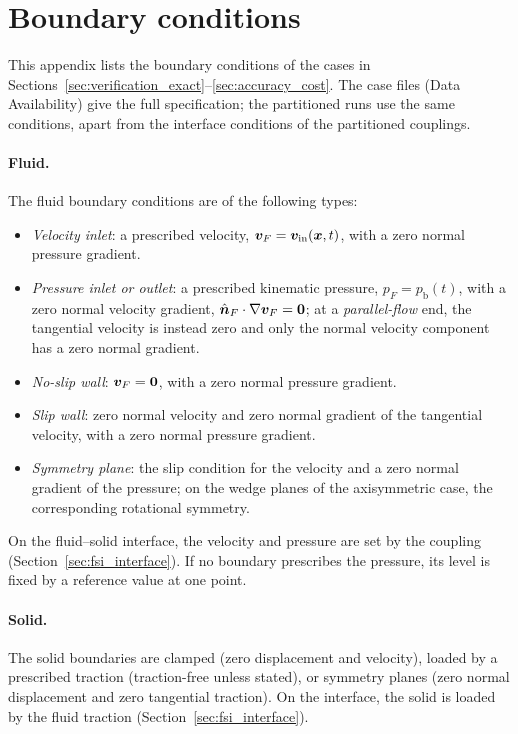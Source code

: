 \section{Boundary conditions}\label{app:boundary_conditions}

This appendix lists the boundary conditions of the cases in Sections~\ref{sec:verification_exact}--\ref{sec:accuracy_cost}.
The case files (Data Availability) give the full specification; the partitioned runs use the same conditions, apart from the interface conditions of the partitioned couplings.

\paragraph{Fluid.}
The fluid boundary conditions are of the following types:
\begin{itemize}
	\item \emph{Velocity inlet}: a prescribed velocity, $\boldsymbol{v}_F = \boldsymbol{v}_\text{in}(\boldsymbol{x}, t)$, with a zero normal pressure gradient.
	\item \emph{Pressure inlet or outlet}: a prescribed kinematic pressure, $p_F = p_\text{b}(t)$, with a zero normal velocity gradient, $\hat{\boldsymbol{n}}_F \cdot \nabla \boldsymbol{v}_F = \boldsymbol{0}$; at a \emph{parallel-flow} end, the tangential velocity is instead zero and only the normal velocity component has a zero normal gradient.
	\item \emph{No-slip wall}: $\boldsymbol{v}_F = \boldsymbol{0}$, with a zero normal pressure gradient.
	\item \emph{Slip wall}: zero normal velocity and zero normal gradient of the tangential velocity, with a zero normal pressure gradient.
	\item \emph{Symmetry plane}: the slip condition for the velocity and a zero normal gradient of the pressure; on the wedge planes of the axisymmetric case, the corresponding rotational symmetry.
\end{itemize}
On the fluid--solid interface, the velocity and pressure are set by the coupling (Section~\ref{sec:fsi_interface}).
If no boundary prescribes the pressure, its level is fixed by a reference value at one point.

\paragraph{Solid.}
The solid boundaries are clamped (zero displacement and velocity), loaded by a prescribed traction (traction-free unless stated), or symmetry planes (zero normal displacement and zero tangential traction).
On the interface, the solid is loaded by the fluid traction (Section~\ref{sec:fsi_interface}).

